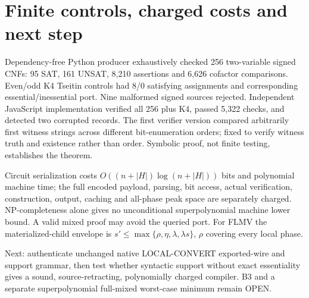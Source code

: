 \documentclass[11pt]{article}
\begin{document}
\section*{Finite controls, charged costs and next step}
Dependency-free Python producer exhaustively checked 256 two-variable signed CNFs: 95 SAT, 161 UNSAT, 8,210 assertions and 6,626 cofactor comparisons. Even/odd K4 Tseitin controls had 8/0 satisfying assignments and corresponding essential/inessential port. Nine malformed signed sources rejected. Independent JavaScript implementation verified all 256 plus K4, passed 5,322 checks, and detected two corrupted records. The first verifier version compared arbitrarily first witness strings across different bit-enumeration orders; fixed to verify witness truth and existence rather than order. Symbolic proof, not finite testing, establishes the theorem.

Circuit serialization costs $O((n+|H|)\log(n+|H|))$ bits and polynomial machine time; the full encoded payload, parsing, bit access, actual verification, construction, output, caching and all-phase peak space are separately charged. NP-completeness alone gives no unconditional superpolynomial machine lower bound. A valid mixed proof may avoid the queried port. For FLMV the materialized-child envelope is $s'\le\max\{\rho,\eta,\lambda,\lambda s\}$, $\rho$ covering every local phase.

Next: authenticate unchanged native LOCAL-CONVERT exported-wire and support grammar, then test whether syntactic support without exact essentiality gives a sound, source-retracting, polynomially charged compiler. B3 and a separate superpolynomial full-mixed worst-case minimum remain OPEN.
\end{document}
